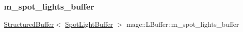 \hypertarget{structmage_1_1_l_buffer_a427d547154709acf94cb10d1e19ac8f2}{}\label{structmage_1_1_l_buffer_a427d547154709acf94cb10d1e19ac8f2} 
\subsubsection{\texorpdfstring{m\+\_\+spot\+\_\+lights\+\_\+buffer}{m\_spot\_lights\_buffer}}
{\footnotesize\ttfamily \hyperlink{structmage_1_1_structured_buffer}{Structured\+Buffer}$<$ \hyperlink{structmage_1_1_spot_light_buffer}{Spot\+Light\+Buffer} $>$ mage\+::\+L\+Buffer\+::m\+\_\+spot\+\_\+lights\+\_\+buffer\hspace{0.3cm}{\ttfamily [private]}}

